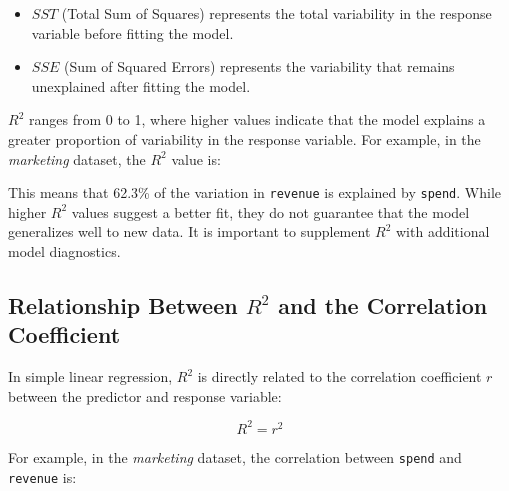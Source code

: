 \documentclass[
  11pt,
]{book}
\makeatletter
\newenvironment{Shaded}{}{}
\newcommand{\DecValTok}[1]{#1}
\newcommand{\FloatTok}[1]{#1}
\newcommand{\FunctionTok}[1]{#1}
\newcommand{\NormalTok}[1]{#1}
\newcommand{\SpecialCharTok}[1]{\textcolor[rgb]{0.39,0.39,0.39}{#1}}
\providecommand{\tightlist}{%
  \setlength{\itemsep}{0pt}\setlength{\parskip}{0pt}}
\newenvironment{kframe}{%
\medskip{}
\setlength{\fboxsep}{.8em}
 \def\at@end@of@kframe{}%
 \ifinner\ifhmode%
  \def\at@end@of@kframe{\end{minipage}}%
  \begin{minipage}{\columnwidth}%
 \fi\fi%
 \def\FrameCommand##1{\hskip\@totalleftmargin \hskip-\fboxsep
 \colorbox{shadecolor}{##1}\hskip-\fboxsep
     \hskip-\linewidth \hskip-\@totalleftmargin \hskip\columnwidth}%
 \MakeFramed {\advance\hsize-\width
   \@totalleftmargin\z@ \linewidth\hsize
   \@setminipage}}%
 {\par\unskip\endMakeFramed%
 \at@end@of@kframe}
\renewenvironment{Shaded}{\begin{kframe}}{\end{kframe}}
\theoremstyle{definition}
\theoremstyle{definition}
\theoremstyle{definition}
\theoremstyle{definition}
\theoremstyle{remark}
\makeatother
\begin{document}
\begin{itemize}
\tightlist
\item
  \(SST\) (Total Sum of Squares) represents the total variability in the response variable before fitting the model.\\
\item
  \(SSE\) (Sum of Squared Errors) represents the variability that remains unexplained after fitting the model.
\end{itemize}

\(R^2\) ranges from 0 to 1, where higher values indicate that the model explains a greater proportion of variability in the response variable. For example, in the \emph{marketing} dataset, the \(R^2\) value is:

\begin{Shaded}
\end{Shaded}

This means that 62.3\% of the variation in \texttt{revenue} is explained by \texttt{spend}. While higher \(R^2\) values suggest a better fit, they do not guarantee that the model generalizes well to new data. It is important to supplement \(R^2\) with additional model diagnostics.

\subsection*{\texorpdfstring{Relationship Between \(R^2\) and the Correlation Coefficient}{Relationship Between R\^{}2 and the Correlation Coefficient}}\label{relationship-between-r2-and-the-correlation-coefficient}


In simple linear regression, \(R^2\) is directly related to the correlation coefficient \(r\) between the predictor and response variable:

\[
R^2 = r^2
\]

For example, in the \emph{marketing} dataset, the correlation between \texttt{spend} and \texttt{revenue} is:

\begin{Shaded}
\end{Shaded}
\end{document}
